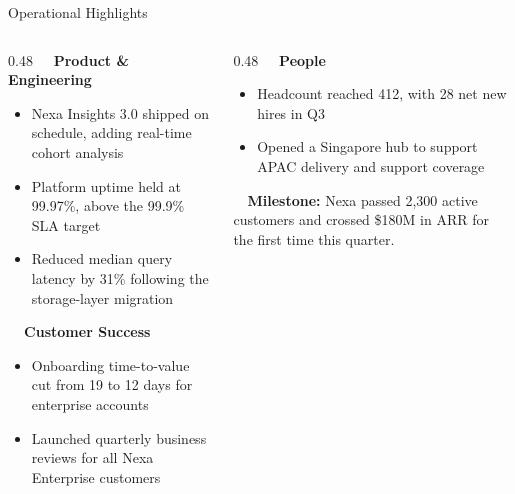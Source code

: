 \documentclass[xcolor=table]{beamer}
\begin{document}
\begin{frame}{Operational Highlights}
\begin{columns}[T]
\begin{column}{0.48\textwidth}
\textbf{\color{corpnavy}\faCogs\ \ Product \& Engineering}
\begin{itemize}[itemsep=6pt]
\item Nexa Insights 3.0 shipped on schedule, adding real-time cohort analysis
\item Platform uptime held at 99.97\%, above the 99.9\% SLA target
\item Reduced median query latency by 31\% following the storage-layer migration
\end{itemize}
\vspace{8pt}
\textbf{\color{corpnavy}\faComments\ \ Customer Success}
\begin{itemize}[itemsep=6pt]
\item Onboarding time-to-value cut from 19 to 12 days for enterprise accounts
\item Launched quarterly business reviews for all Nexa Enterprise customers
\end{itemize}
\end{column}
\begin{column}{0.48\textwidth}
\textbf{\color{corpnavy}\faUsers\ \ People}
\begin{itemize}[itemsep=6pt]
\item Headcount reached 412, with 28 net new hires in Q3
\item Opened a Singapore hub to support APAC delivery and support coverage
\end{itemize}
\vspace{8pt}
\begin{calloutbox}[corpgold]
\faTrophy\ \ \textbf{Milestone:} Nexa passed 2{,}300 active customers and crossed
\$180M in ARR for the first time this quarter.
\end{calloutbox}
\end{column}
\end{columns}
\end{frame}
\end{document}
